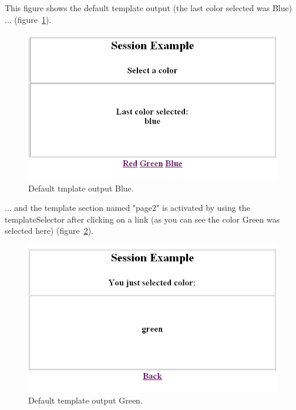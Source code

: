 This figure shows the default template output (the last color selected
was Blue) ... (figure~\ref{SessionExample}).

\begin{figure}
\begin{center}
\includegraphics[clip,width=\sgw]{pics/modules/34}
\end{center}
\caption[Default template output Blue]{Default tmplate output Blue.}
\label{SessionExample}
\end{figure}

... and the template section named {\name "page2"} is activated by using the
templateSelector after clicking on a link (as you can see the color
Green was selected here) (figure~\ref{SessionExample2}).

\begin{figure}
\begin{center}
\includegraphics[clip,width=\sgw]{pics/modules/35}
\end{center}
\caption[Default template output Green]{Default template output Green.}
\label{SessionExample2}
\end{figure}

